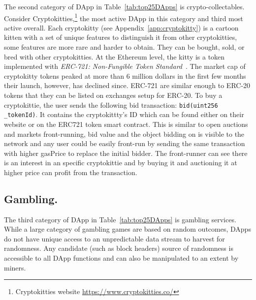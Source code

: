 The second category of DApp in Table~\ref{tab:top25DApps} is crypto-collectables. Consider Cryptokitties,\footnote{Cryptokitties website \url{https://www.cryptokitties.co/}} the most active DApp in this category and third most active overall. Each cryptokitty (see Appendix~\ref{app:cryptokitty}) is a cartoon kitten with a set of unique features to distinguish it from other cryptokitties, some features are more rare and harder to obtain. They can be bought, sold, or bred with other cryptokitties. At the Ethereum level, the kitty is a token implemented with \textit{ERC-721: Non-Fungible Token Standard}~\cite{erc721}. The market cap of cryptokitty tokens peaked at more than 6 million dollars in the first few months their launch, however, has declined since. ERC-721 are similar enough to ERC-20 tokens that they can be listed on exchanges setup for ERC-20. To buy a cryptokittie, the user sends the following bid transaction: \texttt{bid(uint256 \_tokenId)}. It contains the cryptokittty's ID which can be found either on their website or on the ERC721 token smart contract. This is similar to open auctions and markets front-running, bid value and the object bidding on is visible to the network and any user could be easily front-run by sending the same transaction with higher gasPrice to replace the initial bidder. The front-runner can see there is an interest in an specific cryptokittie and by buying it and auctioning it at higher price can profit from the transaction. %



\subsection{Gambling.} 

The third category of DApp in Table~\ref{tab:top25DApps} is gambling services. While a large category of gambling games are based on random outcomes, DApps do not have unique access to an unpredictable data stream to harvest for randomness. Any candidate (such as block headers) source of randomness is accessible to all DApp functions and can also be manipulated to an extent by miners.

